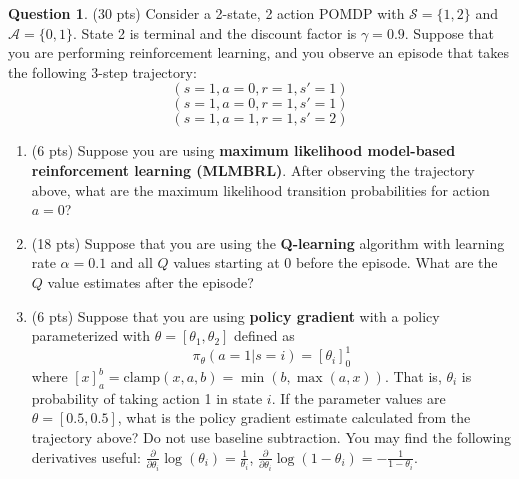 \documentclass{article}
\theoremstyle{definition}
\newtheorem{question}[thm]{Question}
\begin{document}
\begin{question} (30 pts)
    Consider a 2-state, 2 action POMDP with $\mathcal{S} = \{1,2\}$ and $\mathcal{A} = \{0,1\}$. State 2 is terminal and the discount factor is $\gamma=0.9$. Suppose that you are performing reinforcement learning, and you observe an episode that takes the following 3-step trajectory:
    $$(s=1, a=0, r=1, s'=1)$$
    $$(s=1, a=0, r=1, s'=1)$$
    $$(s=1, a=1, r=1, s'=2)$$

    \begin{enumerate}[label=\alph*)]
        \item (6 pts) Suppose you are using \textbf{maximum likelihood model-based reinforcement learning (MLMBRL)}. After observing the trajectory above, what are the maximum likelihood transition probabilities for action $a=0$?
        \item (18 pts) Suppose that you are using the \textbf{Q-learning} algorithm with learning rate $\alpha=0.1$ and all $Q$ values starting at 0 before the episode. What are the $Q$ value estimates after the episode?
        \item (6 pts) Suppose that you are using \textbf{policy gradient} with a policy parameterized with $\theta = [\theta_1, \theta_2]$ defined as
            $$\pi_\theta (a=1 | s=i) = \left[\theta_i\right]_0^1$$
            where $\left[x\right]_a^b = \text{clamp}(x, a, b) = \min(b, \max(a, x))$. That is, $\theta_i$ is probability of taking action 1 in state $i$.  If the parameter values are $\theta = [0.5, 0.5]$, what is the policy gradient estimate calculated from the trajectory above? Do not use baseline subtraction. You may find the following derivatives useful: $\frac{\partial}{\partial \theta_i} \log(\theta_i) = \frac{1}{\theta_i}$, $\frac{\partial}{\partial \theta_i} \log(1-\theta_i) = -\frac{1}{1-\theta_i}$.
    \end{enumerate}
\end{question}
\end{document}
